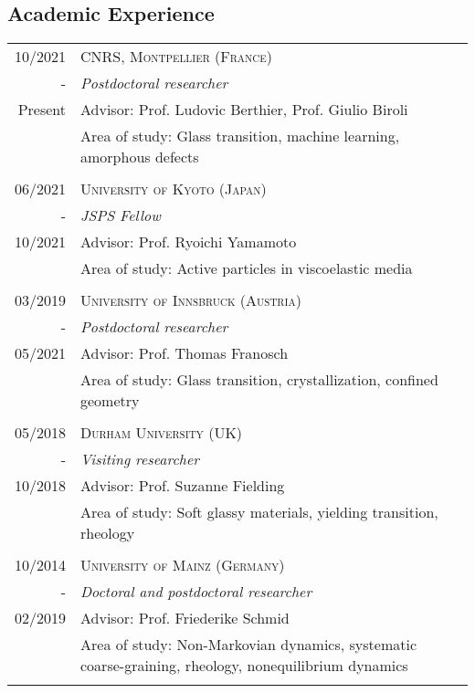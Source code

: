 \subsection*{Academic Experience}
\begin{tabular}{r|p{13cm}}
	
		\textsc{10/2021  }& \textsc{CNRS, Montpellier (France) } \\-&\emph{Postdoctoral researcher}\\
	Present&\footnotesize{Advisor: Prof. Ludovic Berthier, Prof. Giulio Biroli}\\
	&\footnotesize{Area of study: Glass transition, machine learning, amorphous defects}\\
		\multicolumn{2}{c}{}\\
		\textsc{06/2021  }& \textsc{University of Kyoto (Japan) } \\-&\emph{JSPS Fellow}\\
	\textsc{10/2021  }&\footnotesize{Advisor: Prof. Ryoichi Yamamoto}\\
	&\footnotesize{Area of study: Active particles in viscoelastic media}\\
		\multicolumn{2}{c}{}\\
	\textsc{03/2019  }& \textsc{University of Innsbruck (Austria) } \\-&\emph{Postdoctoral researcher}\\
	\textsc{05/2021}&\footnotesize{Advisor: Prof. Thomas Franosch}\\
	&\footnotesize{Area of study: Glass transition, crystallization, confined geometry}\\
	\multicolumn{2}{c}{}\\
	
		\textsc{05/2018  }& \textsc{Durham University (UK)} \\\textsc{}-&\emph{Visiting researcher}\\10/2018&\footnotesize{  Advisor: Prof. Suzanne Fielding }\\
	&\footnotesize{Area of study: Soft glassy materials, yielding transition, rheology}\\
	\multicolumn{2}{c}{}\\
	
	\textsc{10/2014 }& \textsc{University of Mainz (Germany) } \\\textsc{}-&\emph{Doctoral and postdoctoral researcher}\\02/2019 &\footnotesize{Advisor: Prof. Friederike Schmid}
	\\&\footnotesize{Area of study: Non-Markovian dynamics, systematic coarse-graining, rheology, nonequilibrium
		dynamics}
	\\\multicolumn{2}{c}{}
	

	
\end{tabular}

